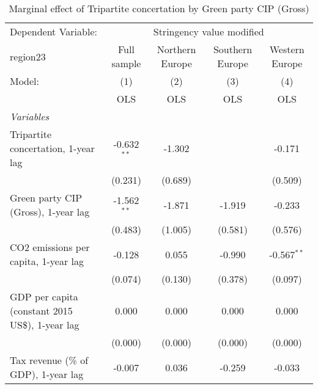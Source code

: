 
\begin{table}[htbp]
   \caption{Marginal effect of Tripartite concertation by Green party CIP (Gross)}
   \centering
   \begin{tabular}{lcccc}
      \toprule
      Dependent Variable: & \multicolumn{4}{c}{Stringency value modified}\\
      region23                                                                  & Full sample   & Northern Europe & Southern Europe & Western Europe \\   
      Model:                                                                    & (1)           & (2)             & (3)             & (4)\\  
                                                                                &  OLS          & OLS             & OLS             & OLS\\  
      \midrule
      \emph{Variables}\\
      Tripartite concertation, 1-year lag                                       & -0.632$^{**}$ & -1.302          &                 & -0.171\\   
                                                                                & (0.231)       & (0.689)         &                 & (0.509)\\   
      Green party CIP (Gross), 1-year lag                                       & -1.562$^{**}$ & -1.871          & -1.919          & -0.233\\   
                                                                                & (0.483)       & (1.005)         & (0.581)         & (0.576)\\   
      CO2 emissions per capita, 1-year lag                                      & -0.128        & 0.055           & -0.990          & -0.567$^{**}$\\   
                                                                                & (0.074)       & (0.130)         & (0.378)         & (0.097)\\   
      GDP per capita (constant 2015 US\$), 1-year lag                           & 0.000         & 0.000           & 0.000           & 0.000\\   
                                                                                & (0.000)       & (0.000)         & (0.000)         & (0.000)\\   
      Tax revenue (\% of GDP), 1-year lag                                       & -0.007        & 0.036           & -0.259          & -0.033\\   

\end{tabular}
\end{table}
